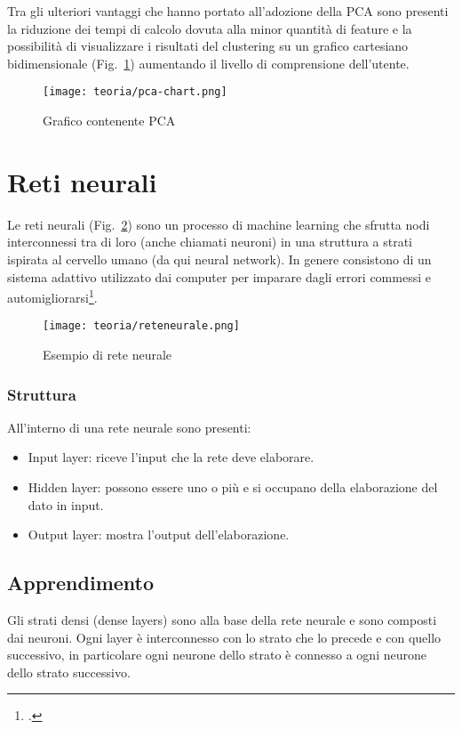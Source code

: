 Tra gli ulteriori vantaggi che hanno portato all'adozione della PCA sono presenti la riduzione dei tempi di calcolo dovuta alla minor quantità di feature e la possibilità di visualizzare i risultati del clustering su un grafico cartesiano bidimensionale (Fig.~\ref{fig:pca-chart}) aumentando il livello di comprensione dell'utente.

\begin{figure}[!h] 
    \centering 
    \texttt{[image: teoria/pca-chart.png]} 
    \caption{Grafico contenente PCA}
    \label{fig:pca-chart}
  \end{figure}

\newpage

\section{Reti neurali}
Le reti neurali (Fig.~\ref{fig:rete-neurale}) sono un processo di machine learning che sfrutta nodi interconnessi tra di loro (anche chiamati neuroni) in una struttura a strati ispirata al cervello umano (da qui neural network).
In genere consistono di un sistema adattivo utilizzato dai computer per imparare dagli errori commessi e automigliorarsi\footcite{site:rete-neurale}.

\begin{figure}[!h] 
    \centering 
    \texttt{[image: teoria/reteneurale.png]} 
    \caption{Esempio di rete neurale}
    \label{fig:rete-neurale}
  \end{figure}

\subsubsection{Struttura}
All'interno di una rete neurale sono presenti:
\begin{itemize}
    \item Input layer: riceve l'input che la rete deve elaborare.
    \item Hidden layer: possono essere uno o più e si occupano della elaborazione del dato in input.
    \item Output layer: mostra l'output dell'elaborazione.
\end{itemize}

\subsection{Apprendimento}
Gli strati densi (dense layers) sono alla base della rete neurale e sono composti dai neuroni.
Ogni layer è interconnesso con lo strato che lo precede e con quello successivo, in particolare ogni neurone dello strato è connesso a ogni neurone dello strato successivo.


